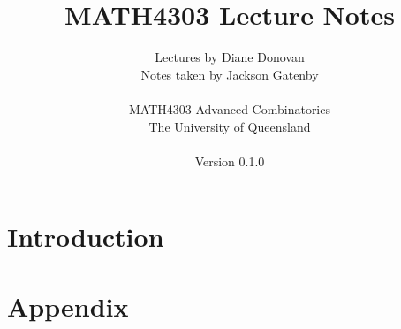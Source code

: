 \documentclass[a4paper]{report}
\title{MATH4303 Lecture Notes}
\author{Lectures by Diane Donovan\\
Notes taken by Jackson Gatenby\\
\\
MATH4303 Advanced Combinatorics\\
The University of Queensland\\
\\
Version 0.1.0}
\begin{document}
\maketitle
\tableofcontents

\chapter{Introduction}



\appendix
\chapter{Appendix}

\end{document}
